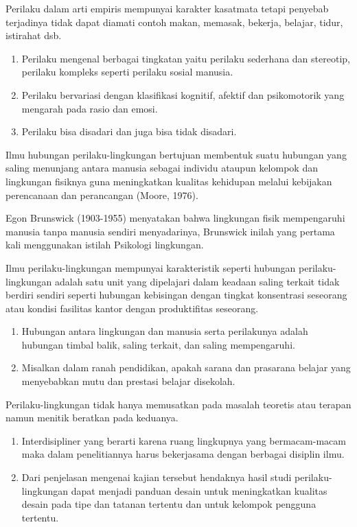 \documentclass[../manperil.tex]{subfiles}
\begin{document}
Perilaku dalam arti empiris mempunyai karakter kasatmata tetapi penyebab terjadinya tidak dapat diamati contoh makan, memasak, bekerja, belajar, tidur, istirahat dsb.

\begin{enumerate}
	\item Perilaku mengenal berbagai tingkatan yaitu perilaku sederhana dan stereotip, perilaku kompleks seperti perilaku sosial manusia.
	\item Perilaku bervariasi dengan klasifikasi kognitif, afektif dan psikomotorik yang mengarah pada rasio dan emosi.
	\item Perilaku bisa disadari dan juga bisa tidak disadari.
\end{enumerate}

Ilmu hubungan perilaku-lingkungan bertujuan membentuk suatu hubungan yang saling menunjang antara manusia sebagai individu ataupun kelompok dan lingkungan fisiknya guna meningkatkan kualitas kehidupan melalui kebijakan perencanaan dan perancangan (Moore, 1976).

Egon Brunswick (1903-1955) menyatakan bahwa lingkungan fisik mempengaruhi manusia tanpa manusia sendiri menyadarinya, Brunswick inilah yang pertama kali menggunakan istilah Psikologi lingkungan.

Ilmu perilaku-lingkungan mempunyai karakteristik seperti hubungan perilaku-lingkungan adalah satu unit yang dipelajari dalam keadaan saling terkait tidak berdiri sendiri seperti hubungan kebisingan dengan tingkat konsentrasi seseorang atau kondisi fasilitas kantor dengan produktifitas seseorang.

\begin{enumerate}
	\item Hubungan antara lingkungan dan manusia serta perilakunya adalah hubungan timbal balik, saling terkait, dan saling mempengaruhi.
	\item Misalkan dalam ranah pendidikan, apakah sarana dan prasarana belajar yang menyebabkan mutu dan prestasi belajar disekolah.
\end{enumerate}

Perilaku-lingkungan tidak hanya memusatkan pada masalah teoretis atau terapan namun menitik beratkan pada keduanya.

\begin{enumerate}
	\item Interdisipliner yang berarti karena ruang lingkupnya yang bermacam-macam maka dalam penelitiannya harus bekerjasama dengan berbagai disiplin ilmu.
	\item Dari penjelasan mengenai kajian tersebut hendaknya hasil studi perilaku-lingkungan dapat menjadi panduan desain untuk meningkatkan kualitas desain pada tipe dan tatanan tertentu dan untuk kelompok pengguna tertentu.
\end{enumerate}
\end{document}
